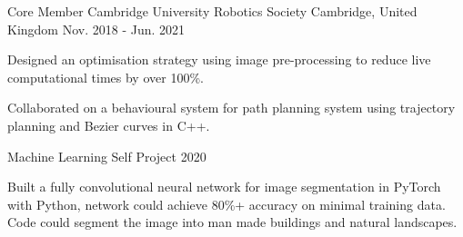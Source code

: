 

\begin{cventries}

  \cventry
    {Core Member} %
    {Cambridge University Robotics Society} %
    {Cambridge, United Kingdom} %
    {Nov. 2018 - Jun. 2021} %
    {
      \begin{cvitems} %
        \item {Designed an optimisation strategy using image pre-processing to reduce live computational times by over 100\%.}
        \item {Collaborated on a behavioural system for path planning system using trajectory planning and Bezier curves in C++.}
      \end{cvitems}
    }

  \cventry
    {} %
    {Machine Learning Self Project} %
    {2020} %
    {} %
    {
      \begin{cvitems} %
        \item {Built a fully convolutional neural network for image segmentation in PyTorch with Python, network could achieve 80\%+ accuracy on minimal training data. Code could segment the image into man made buildings and natural landscapes.}
      \end{cvitems}
    }
\end{cventries}
